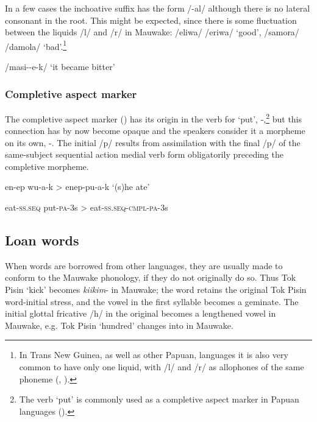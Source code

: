 In a few cases the inchoative suffix has the form /-al/ although there is no lateral consonant in the root.  This might be expected, since there is some fluctuation between the liquids /l/ and /r/ in Mauwake: /eliwa/ {\Tilde} /eriwa/ `good', /samora/ {\Tilde} /damola/ `bad'.\footnote{In Trans New Guinea, as well as other Papuan, languages it is also very common to have only one liquid, with /l/ and /r/ as allophones of the same phoneme (\citealt[55]{Wurm1982}, \citealt[55]{Foley1986}).} 

/masi--e-k/  `it became bitter'

\subsubsection[Completive aspect marker]{Completive aspect marker}

The completive aspect marker () has its origin in the verb for `put', \nobreakdash-,\footnote{The verb `put' is commonly used as a completive aspect marker in Papuan languages ().} but this connection has by now become opaque and the speakers consider it a morpheme on its own, -.  The initial /p/ results from assimilation with the final /p/ of the same-subject sequential action medial verb form obligatorily preceding the completive morpheme.

en-ep  wu-a-k  {{\textgreater}  enep-pu-a-k } `(s)he ate'

eat-\textsc{ss}.\textsc{seq}  put-\textsc{pa}-3s  {{\textgreater}}  eat-\textsc{ss}.\textsc{seq}-\textsc{cmpl}-\textsc{pa}-3s

\subsection{Loan words}

When words are borrowed from other languages, they are usually made to conform to the Mauwake phonology, if they do not originally do so.  Thus Tok Pisin  `kick' becomes \textit{kiikim}- in Mauwake; the word retains the original Tok Pisin word-initial stress, and the vowel in the first syllable becomes a geminate.  The initial glottal fricative /h/ in the original becomes a lengthened vowel in Mauwake, e.g. Tok Pisin  `hundred' changes into   in Mauwake.

